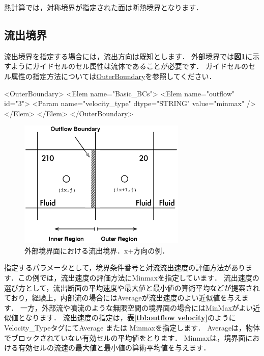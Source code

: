 熱計算では，対称境界が指定された面は断熱境界となります．


\pagebreak
\subsection{流出境界}

流出境界を指定する場合には，流出方向は既知とします．
外部境界では\textbf{図\ref{fig:outflow BC outer}}に示すようにガイドセルのセル属性は流体であることが必要です．
ガイドセルのセル属性の指定方法については\hyperlink{tgt:outer_boundary}{OuterBoundary}を参照してください．

{\small
\begin{program}
<OuterBoundary>
  <Elem name="Basic_BCs">
    <Elem name="outflow" id="3">
      <Param name="velocity_type" dtype="STRING" value="minmax" />
    </Elem>
  </Elem>
</OuterBoundary>
\end{program}
}

\begin{figure}[htbp]
\begin{center}
\includegraphics[width=8cm,clip]{outflowBC_outer.eps}
\end{center}
\caption{外部境界面における流出境界．x+方向の例．}
\label{fig:outflow BC outer}
\end{figure}

\noindent 指定するパラメータとして，境界条件番号と対流流出速度の評価方法があります．この例では，流出速度の評価方法にMinmaxを指定しています．
流出速度の選び方として，流出断面の平均速度や最大値と最小値の算術平均などが提案されており，経験上，内部流の場合にはAverageが流出速度のよい近似値を与えます．
一方，外部流や噴流のような無限空間の境界面の場合にはMinMaxがよい近似値となります．
流出速度の指定は，\textbf{表\ref{tbl:outflow velocity}}のようにVelocity\_TypeタグにてAverage または Minmaxを指定します．
Averageは，物体でブロックされていない有効セルの平均値をとります．
Minmaxは，境界面における有効セルの流速の最大値と最小値の算術平均値を与えます．


